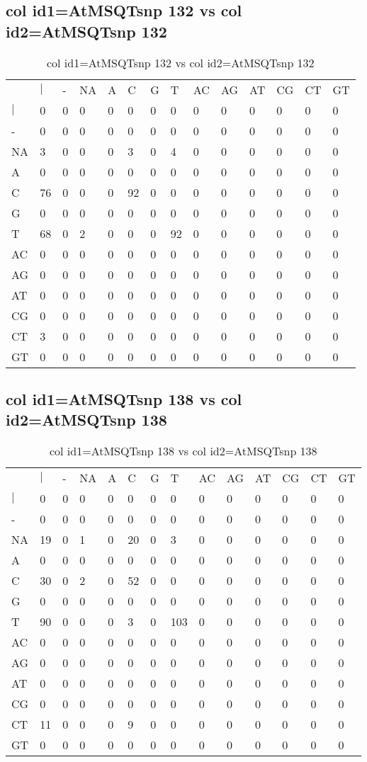 \subsection{col id1=AtMSQTsnp 132 vs col id2=AtMSQTsnp 132}
\begin{center}
\begin{longtable}{|l|l|l|l|l|l|l|l|l|l|l|l|l|l|}
\caption{col id1=AtMSQTsnp 132 vs col id2=AtMSQTsnp 132} \label{table_dm716}\\
\hline
\\
\hline
&$|$&-&NA&A&C&G&T&AC&AG&AT&CG&CT&GT\\
$|$&0&0&0&0&0&0&0&0&0&0&0&0&0\\
-&0&0&0&0&0&0&0&0&0&0&0&0&0\\
NA&3&0&0&0&3&0&4&0&0&0&0&0&0\\
A&0&0&0&0&0&0&0&0&0&0&0&0&0\\
C&76&0&0&0&92&0&0&0&0&0&0&0&0\\
G&0&0&0&0&0&0&0&0&0&0&0&0&0\\
T&68&0&2&0&0&0&92&0&0&0&0&0&0\\
AC&0&0&0&0&0&0&0&0&0&0&0&0&0\\
AG&0&0&0&0&0&0&0&0&0&0&0&0&0\\
AT&0&0&0&0&0&0&0&0&0&0&0&0&0\\
CG&0&0&0&0&0&0&0&0&0&0&0&0&0\\
CT&3&0&0&0&0&0&0&0&0&0&0&0&0\\
GT&0&0&0&0&0&0&0&0&0&0&0&0&0\\
\hline
\end{longtable}
\end{center}

\subsection{col id1=AtMSQTsnp 138 vs col id2=AtMSQTsnp 138}
\begin{center}
\begin{longtable}{|l|l|l|l|l|l|l|l|l|l|l|l|l|l|}
\caption{col id1=AtMSQTsnp 138 vs col id2=AtMSQTsnp 138} \label{table_dm718}\\
\hline
\\
\hline
&$|$&-&NA&A&C&G&T&AC&AG&AT&CG&CT&GT\\
$|$&0&0&0&0&0&0&0&0&0&0&0&0&0\\
-&0&0&0&0&0&0&0&0&0&0&0&0&0\\
NA&19&0&1&0&20&0&3&0&0&0&0&0&0\\
A&0&0&0&0&0&0&0&0&0&0&0&0&0\\
C&30&0&2&0&52&0&0&0&0&0&0&0&0\\
G&0&0&0&0&0&0&0&0&0&0&0&0&0\\
T&90&0&0&0&3&0&103&0&0&0&0&0&0\\
AC&0&0&0&0&0&0&0&0&0&0&0&0&0\\
AG&0&0&0&0&0&0&0&0&0&0&0&0&0\\
AT&0&0&0&0&0&0&0&0&0&0&0&0&0\\
CG&0&0&0&0&0&0&0&0&0&0&0&0&0\\
CT&11&0&0&0&9&0&0&0&0&0&0&0&0\\
GT&0&0&0&0&0&0&0&0&0&0&0&0&0\\
\hline
\end{longtable}
\end{center}

